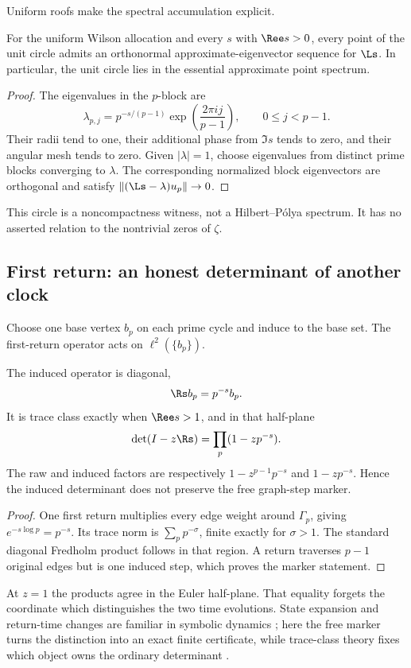 Uniform roofs make the spectral accumulation explicit.

\begin{corollary}
\label{cor:essential-circle}
For the uniform Wilson allocation and every $s$ with $\Ree s>0$, every point
of the unit circle admits an orthonormal approximate-eigenvector sequence for
$\Ls$.  In particular, the unit circle lies in the essential approximate
point spectrum.
\end{corollary}

\begin{proof}
The eigenvalues in the $p$-block are
\[
  \lambda_{p,j}=p^{-s/(p-1)}
  \exp\!\left(\frac{2\pi i j}{p-1}\right),
  \qquad0\leq j<p-1.
\]
Their radii tend to one, their additional phase from $\Im s$ tends to zero,
and their angular mesh tends to zero.  Given $|\lambda|=1$, choose eigenvalues
from distinct prime blocks converging to $\lambda$.  The corresponding
normalized block eigenvectors are orthogonal and satisfy
$\|(\Ls-\lambda)u_p\|\to0$.
\end{proof}

This circle is a noncompactness witness, not a Hilbert--P\'olya spectrum.  It
has no asserted relation to the nontrivial zeros of $\zeta$.

\subsection{First return: an honest determinant of another clock}

Choose one base vertex $b_p$ on each prime cycle and induce to the base set.
The first-return operator acts on $\ell^2(\{b_p\})$.

\begin{theorem}
\label{thm:first-return}
The induced operator is diagonal,
\[
  \Rs b_p=p^{-s}b_p.
\]
It is trace class exactly when $\Ree s>1$, and in that half-plane
\[
  \det(I-z\Rs)=\prod_p(1-zp^{-s}).
\]
The raw and induced factors are respectively
$1-z^{p-1}p^{-s}$ and $1-zp^{-s}$.  Hence the induced determinant does not
preserve the free graph-step marker.
\end{theorem}

\begin{proof}
One first return multiplies every edge weight around $\Gamma_p$, giving
$e^{-s\log p}=p^{-s}$.  Its trace norm is $\sum_p p^{-\sigma}$, finite
exactly for $\sigma>1$.  The standard diagonal Fredholm product follows in
that region.  A return traverses $p-1$ original edges but is one induced step,
which proves the marker statement.
\end{proof}



At $z=1$ the products agree in the Euler half-plane.  That equality forgets
the coordinate which distinguishes the two time evolutions.  State expansion
and return-time changes are familiar in symbolic dynamics
\citep{ParrySullivan1975}; here the free marker turns the distinction into an
exact finite certificate, while trace-class theory fixes which object owns
the ordinary determinant \citep{Simon1977}.
